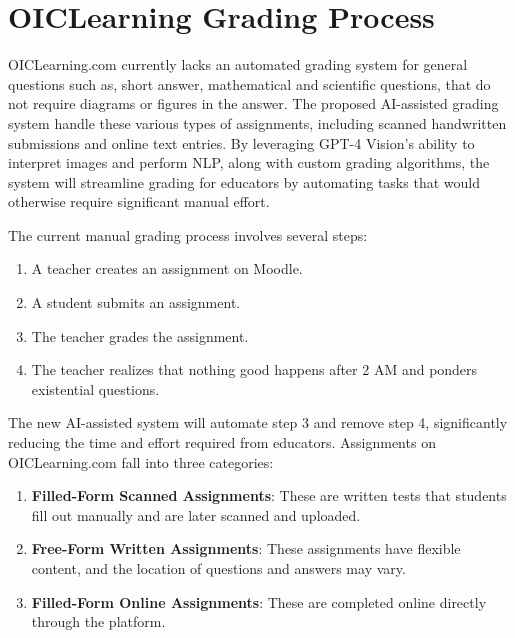 \documentclass[ms,twoside,print]{nuthesis}
\begin{document}
\section{OICLearning Grading Process}

OICLearning.com currently lacks an automated grading system for general questions such as, short answer, mathematical and scientific questions, that do not require diagrams or figures in the answer. The proposed AI-assisted grading system handle these various types of assignments, including scanned handwritten submissions and online text entries. By leveraging GPT-4 Vision's ability to interpret images and perform NLP, along with custom grading algorithms, the system will streamline grading for educators by automating tasks that would otherwise require significant manual effort.



The current manual grading process involves several steps:

\begin{enumerate}
    \item A teacher creates an assignment on Moodle.
    \item A student submits an assignment.
    \item The teacher grades the assignment.
    \item The teacher realizes that nothing good happens after 2 AM and ponders existential questions.
\end{enumerate}

The new AI-assisted system will automate step 3 and remove step 4, significantly reducing the time and effort required from educators. Assignments on OICLearning.com fall into three categories:

\begin{enumerate}
    \item \textbf{Filled-Form Scanned Assignments}: These are written tests that students fill out manually and are later scanned and uploaded.
    \item \textbf{Free-Form Written Assignments}: These assignments have flexible content, and the location of questions and answers may vary.
    \item \textbf{Filled-Form Online Assignments}: These are completed online directly through the platform.
\end{enumerate}
\end{document}
